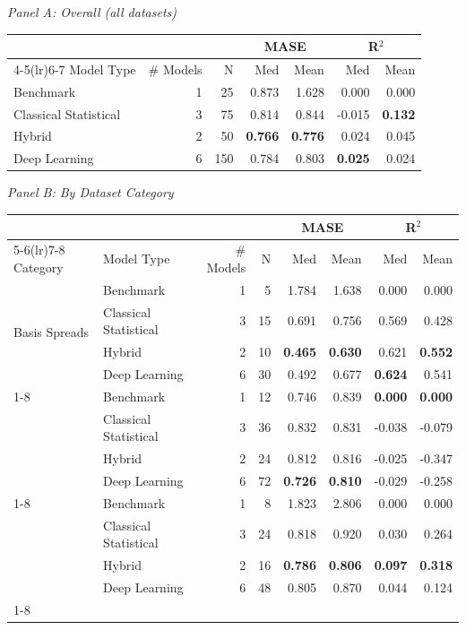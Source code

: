 \scriptsize
\setlength{\tabcolsep}{4pt}
\renewcommand{\arraystretch}{1.0}
\begin{minipage}{\linewidth}
\centering
\noindent\textit{Panel A: Overall (all datasets)}\par\vspace{0.25em}
\begin{tabular}{lrrrrrr}
\toprule
 &  &  & \multicolumn{2}{c}{MASE} & \multicolumn{2}{c}{R$^2$} \\
\cmidrule(lr){4-5}\cmidrule(lr){6-7}
Model Type & \# Models & N & Med & Mean & Med & Mean \\
\midrule
Benchmark & 1 & 25 & 0.873 & 1.628 & 0.000 & 0.000 \\
Classical Statistical & 3 & 75 & 0.814 & 0.844 & -0.015 & \textbf{0.132} \\
Hybrid & 2 & 50 & \textbf{0.766} & \textbf{0.776} & 0.024 & 0.045 \\
Deep Learning & 6 & 150 & 0.784 & 0.803 & \textbf{0.025} & 0.024 \\
\bottomrule
\end{tabular}

\vspace{0.75em}
\noindent\textit{Panel B: By Dataset Category}\par\vspace{0.25em}
\begin{tabular}{llrrrrrr}
\toprule
 &  &  &  & \multicolumn{2}{c}{MASE} & \multicolumn{2}{c}{R$^2$} \\
\cmidrule(lr){5-6}\cmidrule(lr){7-8}
Category & Model Type & \# Models & N & Med & Mean & Med & Mean \\
\midrule
\multirow[t]{4}{*}{Basis Spreads} & Benchmark & 1 & 5 & 1.784 & 1.638 & 0.000 & 0.000 \\
 & Classical Statistical & 3 & 15 & 0.691 & 0.756 & 0.569 & 0.428 \\
 & Hybrid & 2 & 10 & \textbf{0.465} & \textbf{0.630} & 0.621 & \textbf{0.552} \\
 & Deep Learning & 6 & 30 & 0.492 & 0.677 & \textbf{0.624} & 0.541 \\
\cline{1-8}
\multirow[t]{4}{*}{Returns} & Benchmark & 1 & 12 & 0.746 & 0.839 & \textbf{0.000} & \textbf{0.000} \\
 & Classical Statistical & 3 & 36 & 0.832 & 0.831 & -0.038 & -0.079 \\
 & Hybrid & 2 & 24 & 0.812 & 0.816 & -0.025 & -0.347 \\
 & Deep Learning & 6 & 72 & \textbf{0.726} & \textbf{0.810} & -0.029 & -0.258 \\
\cline{1-8}
\multirow[t]{4}{*}{Other} & Benchmark & 1 & 8 & 1.823 & 2.806 & 0.000 & 0.000 \\
 & Classical Statistical & 3 & 24 & 0.818 & 0.920 & 0.030 & 0.264 \\
 & Hybrid & 2 & 16 & \textbf{0.786} & \textbf{0.806} & \textbf{0.097} & \textbf{0.318} \\
 & Deep Learning & 6 & 48 & 0.805 & 0.870 & 0.044 & 0.124 \\
\cline{1-8}
\bottomrule
\end{tabular}
\end{minipage}